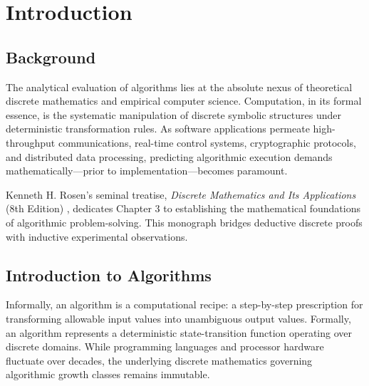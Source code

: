 \documentclass[11pt,a4paper,oneside]{report}
\theoremstyle{definition}
\begin{document}
\clearpage

\tableofcontents
\clearpage

\listoffigures
\clearpage

\listoftables
\clearpage

\setcounter{page}{1}

\chapter{Introduction}
\label{chap:introduction}

\section{Background}
The analytical evaluation of algorithms lies at the absolute nexus of theoretical discrete mathematics and empirical computer science. Computation, in its formal essence, is the systematic manipulation of discrete symbolic structures under deterministic transformation rules. As software applications permeate high-throughput communications, real-time control systems, cryptographic protocols, and distributed data processing, predicting algorithmic execution demands mathematically—prior to implementation—becomes paramount.

Kenneth H. Rosen's seminal treatise, \emph{Discrete Mathematics and Its Applications} (8th Edition) \cite{rosen2019discrete}, dedicates Chapter 3 to establishing the mathematical foundations of algorithmic problem-solving. This monograph bridges deductive discrete proofs with inductive experimental observations.

\section{Introduction to Algorithms}
Informally, an algorithm is a computational recipe: a step-by-step prescription for transforming allowable input values into unambiguous output values. Formally, an algorithm represents a deterministic state-transition function operating over discrete domains. While programming languages and processor hardware fluctuate over decades, the underlying discrete mathematics governing algorithmic growth classes remains immutable.
\end{document}
